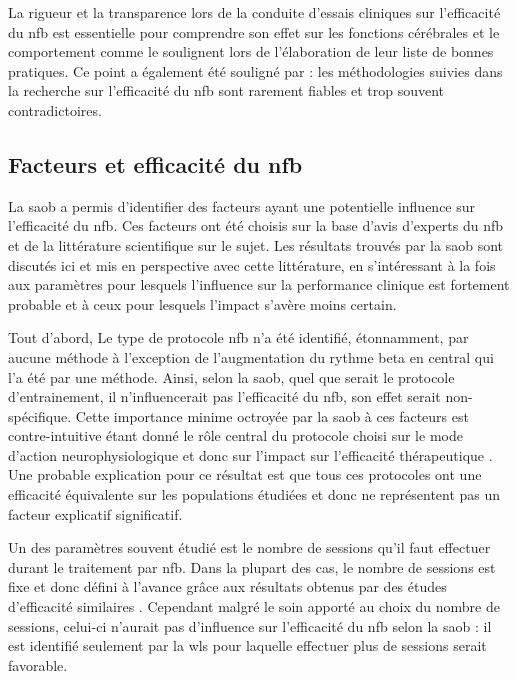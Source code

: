 La rigueur et la transparence lors de la conduite d'essais cliniques sur l'efficacité
du \gls{nfb} est essentielle pour comprendre son effet sur les fonctions cérébrales et le comportement comme le soulignent \citet{Ros2019} lors de l'élaboration
de leur liste de bonnes pratiques. Ce point a également été souligné par \citet{Rogala2016} : les méthodologies suivies dans la recherche sur l'efficacité du
\gls{nfb} sont rarement fiables et trop souvent contradictoires.

\subsection{Facteurs et efficacité du \gls{nfb}} \label{discussion_factors}

La \gls{saob} a permis d'identifier des facteurs ayant une potentielle influence sur l'efficacité du \gls{nfb}. Ces facteurs ont été choisis sur la base d'avis d'experts
du \gls{nfb} et de la littérature scientifique sur le sujet. Les résultats trouvés par la \gls{saob} sont discutés ici et mis en perspective avec cette littérature, en s'intéressant à la fois 
aux paramètres pour lesquels l'influence sur la performance clinique est fortement probable et à ceux pour lesquels l'impact s'avère moins certain. 

Tout d'abord, Le type de protocole \gls{nfb} n'a été identifié, étonnamment, par aucune méthode à l'exception de l'augmentation du rythme beta en central qui l'a été par une méthode. 
Ainsi, selon la \gls{saob}, quel que serait le protocole d'entrainement, il n'influencerait pas l'efficacité du \gls{nfb}, son effet serait non-spécifique. Cette importance 
minime octroyée par la \gls{saob} à ces facteurs est contre-intuitive étant donné le rôle central du protocole choisi sur le mode d'action neurophysiologique 
et donc sur l'impact sur l'efficacité thérapeutique \citep{Vernon2004, Heinrich2019}. Une probable 
explication pour ce résultat est que tous ces protocoles ont une efficacité équivalente sur les populations étudiées et donc ne représentent 
pas un facteur explicatif significatif.
  
Un des paramètres souvent étudié est le nombre de sessions qu'il faut effectuer durant le traitement par \gls{nfb}. Dans la plupart des cas, le nombre 
de sessions est fixe et donc défini à l'avance grâce aux résultats obtenus par des études d'efficacité similaires \citep{Enriquez2017}. Cependant malgré le soin apporté
au choix du nombre de sessions, celui-ci n'aurait pas d'influence sur l'efficacité du \gls{nfb} selon la \gls{saob} : il est identifié seulement par la \gls{wls} pour laquelle effectuer 
plus de sessions serait favorable. 

